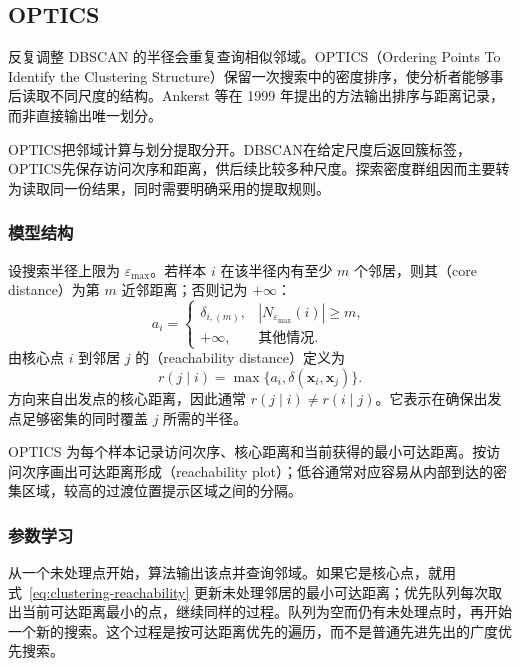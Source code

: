 \subsection{OPTICS}
\label{sec:clustering-optics}

反复调整 DBSCAN 的半径会重复查询相似邻域。OPTICS（Ordering Points To Identify the Clustering Structure）保留一次搜索中的密度排序，使分析者能够事后读取不同尺度的结构。Ankerst 等在 1999 年提出的方法输出排序与距离记录，而非直接输出唯一划分。

OPTICS把邻域计算与划分提取分开。DBSCAN在给定尺度后返回簇标签，OPTICS先保存访问次序和距离，供后续比较多种尺度。探索密度群组因而主要转为读取同一份结果，同时需要明确采用的提取规则。

\subsubsection{模型结构}

设搜索半径上限为 $\varepsilon_{\max}$。若样本 $i$ 在该半径内有至少 $m$ 个邻居，则其（core distance）为第 $m$ 近邻距离；否则记为 $+\infty$：
\[
 a_i=
 \begin{cases}
 \delta_{i,(m)},&|N_{\varepsilon_{\max}}(i)|\geq m,\\
 +\infty,&\text{其他情况}.
 \end{cases}
\]
由核心点 $i$ 到邻居 $j$ 的（reachability distance）定义为
\begin{equation}
 r(j\mid i)=\max\{a_i,\delta(\bm{x}_i,\bm{x}_j)\}.
 \label{eq:clustering-reachability}
\end{equation}
方向来自出发点的核心距离，因此通常 $r(j\mid i)\ne r(i\mid j)$。它表示在确保出发点足够密集的同时覆盖 $j$ 所需的半径。

OPTICS 为每个样本记录访问次序、核心距离和当前获得的最小可达距离。按访问次序画出可达距离形成（reachability plot）；低谷通常对应容易从内部到达的密集区域，较高的过渡位置提示区域之间的分隔。

\subsubsection{参数学习}

从一个未处理点开始，算法输出该点并查询邻域。如果它是核心点，就用式~\eqref{eq:clustering-reachability} 更新未处理邻居的最小可达距离；优先队列每次取出当前可达距离最小的点，继续同样的过程。队列为空而仍有未处理点时，再开始一个新的搜索。这个过程是按可达距离优先的遍历，而不是普通先进先出的广度优先搜索。

